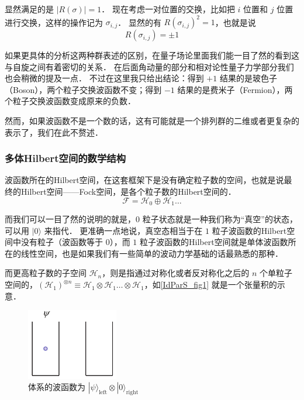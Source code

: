 显然满足的是 $|R(\sigma)| = 1$． 现在考虑一对位置的交换，比如把 $i$ 位置和 $j$ 位置进行交换，这样的操作记为 $\sigma_{i,j}$． 显然的有 $R(\sigma_{i,j})^2 = 1$，也就是说
\begin{equation}
R(\sigma_{i,j}) = \pm 1
\end{equation}

如果更具体的分析这两种群表述的区别，在量子场论里面我们能一目了然的看到这与自旋之间有着密切的关系． 在后面角动量的部分和相对论性量子力学部分我们也会稍微的提及一点． 不过在这里我只给出结论：得到 $+1$ 结果的是玻色子（Boson），两个粒子交换波函数不变；得到 $-1$ 结果的是费米子（Fermion），两个粒子交换波函数变成原来的负数．

然而，如果波函数不是一个数的话，这有可能就是一个排列群的二维或者更复杂的表示了，我们在此不赘述．

\subsubsection{多体Hilbert空间的数学结构}

波函数所在的Hilbert空间，在这套框架下是没有确定粒子数的空间，也就是说最终的Hilbert空间——Fock空间，是各个粒子数的Hilbert空间的．
\begin{equation}
\mathcal{F} = \mathcal{H}_0 \oplus \mathcal{H}_1\dots
\end{equation}

而我们可以一目了然的说明的就是，$0$ 粒子状态就是一种我们称为“真空”的状态，可以用 $|0\rangle$ 来指代． 更准确一点地说，真空态相当于在 $1$ 粒子波函数的Hilbert空间中没有粒子（波函数等于 $0$），而 $1$ 粒子波函数的Hilbert空间就是单体波函数所在的线性空间，也是如果我们有一些简单的波动力学基础的话最熟悉的那种．

而更高粒子数的子空间 $\mathcal{H}_n$，则是指通过对称化或者反对称化之后的 $n$ 个单粒子空间的，$(\mathcal{H}_1)^{\otimes n} \equiv \mathcal{H}_1\otimes \mathcal{H}_1\dots\otimes\mathcal{H}_1$，如\autoref{IdParS_fig1} 就是一个张量积的示意．

\begin{figure}[ht]
\centering
\includegraphics[width=4cm]{./figures/IdParS.pdf}
\caption{体系的波函数为 $|\psi\rangle_\text{left}\otimes|0\rangle_\text{right}$} \label{IdParS_fig1}
\end{figure}

